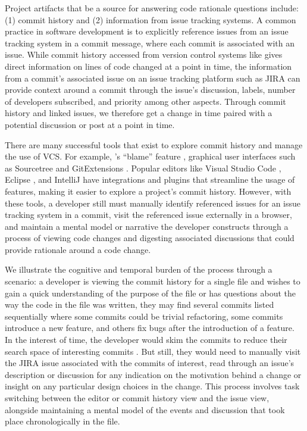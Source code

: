 Project artifacts that be a source for answering code rationale questions include: (1) commit history and (2) information from issue tracking systems. 
A common practice in software development is to explicitly reference issues from an issue tracking system in a commit message, where each commit is associated with an issue. 
While commit history accessed from version control systems like  gives direct information on lines of code changed at a point in time, the information from a commit's associated issue on an issue tracking platform such as JIRA \cite{jira} can provide context around a commit through the issue's discussion, labels, number of developers subscribed, and priority among other aspects.
Through commit history and linked issues, we therefore get a change in time paired with a potential discussion or post at a point in time.

There are many successful tools that exist to explore commit history and manage the use of VCS. For example, 's ``blame'' feature \cite{gitblame}, graphical user interfaces such as Sourcetree \cite{sourcetree} and GitExtensions \cite{gitextensions}. 
Popular editors like Visual Studio Code \cite{vscode}, Eclipse \cite{eclipse}, and IntelliJ \cite{intellij} have  integrations and plugins that streamline the usage of  features, making it easier to explore a project's commit history. 
However, with these tools, a developer still must manually identify referenced issues for an issue tracking system in a commit, visit the referenced issue externally in a browser, and maintain a mental model or narrative the developer constructs through a process of viewing code changes and digesting associated discussions that could provide rationale around a code change. 

We illustrate the cognitive and temporal burden of the process through a scenario: a developer is viewing the commit history for a single file and wishes to gain a quick understanding of the purpose of the file or has questions about the way the code in the file was written, they may find several commits listed sequentially where some commits could be trivial refactoring, some commits introduce a new feature, and others fix bugs after the introduction of a feature. 
In the interest of time, the developer would skim the commits to reduce their search space of interesting commits \cite{codoban_software_2015}. 
But still, they would need to manually visit the JIRA issue associated with the commits of interest, read through an issue's description or discussion for any indication on the motivation behind a change or insight on any particular design choices in the change.
This process involves task switching between the editor or commit history view and the issue view, alongside maintaining a mental model of the events and discussion that took place chronologically in the file.

